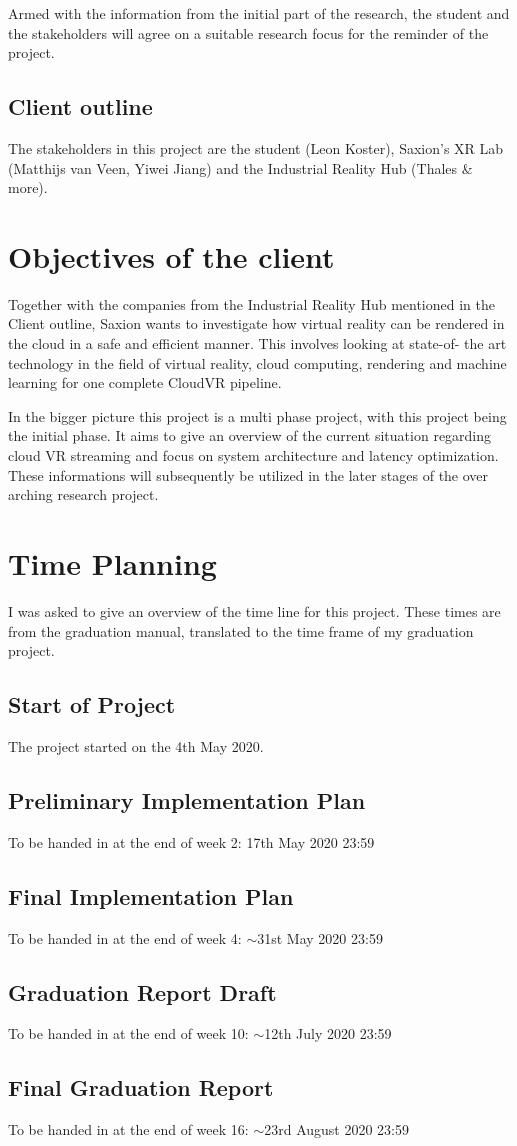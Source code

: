 \documentclass[]{article}
\begin{document}
Armed with the information from the initial part of the research, the student and the stakeholders will agree on a suitable research focus for the reminder of the project.
\subsection{Client outline}
The stakeholders in this project are the student (Leon Koster), Saxion's XR Lab (Matthijs van Veen, Yiwei Jiang) and the Industrial Reality Hub (Thales \& more).
\section{Objectives of the client}
Together with the companies from the Industrial Reality Hub mentioned in the Client outline, Saxion wants to investigate how virtual reality can be rendered in the cloud in a safe and efficient manner. This involves looking at state-of-
the art technology in the field of virtual reality, cloud computing, rendering and machine learning for one
complete CloudVR pipeline. 

In the bigger picture this project is a multi phase project, with this project being the initial phase. It aims to give an overview of the current situation regarding cloud VR streaming and focus on system architecture and latency optimization. These informations will subsequently be utilized in the later stages of the over arching research project.

\section{Time Planning}
I was asked to give an overview of the time line for this project. These times are from the graduation manual, translated to the time frame of my graduation project. 
\subsection{Start of Project}
The project started on the 4th May 2020.
\subsection{Preliminary Implementation Plan}
To be handed in at the end of week 2: 17th May 2020 23:59
\subsection{Final Implementation Plan}
To be handed in at the end of week 4: $\sim$31st May 2020 23:59
\subsection{Graduation Report Draft}
To be handed in at the end of week 10: $\sim$12th July 2020 23:59
\subsection{Final Graduation Report}
To be handed in at the end of week 16: $\sim$23rd August 2020 23:59
\end{document}
